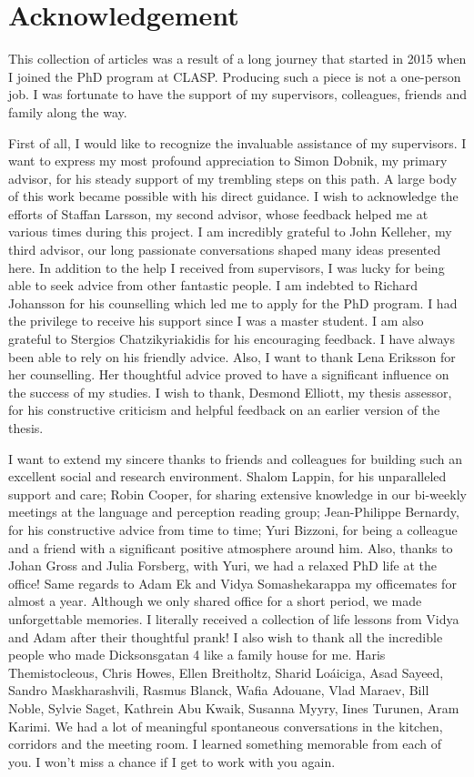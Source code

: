 \chapter*{Acknowledgement}
\label{sec:acknowledgement}
This collection of articles was a result of a long journey that started in 2015 when I joined the PhD program at CLASP. Producing such a piece is not a one-person job. I was fortunate to have the support of my supervisors, colleagues, friends and family along the way.

First of all, I would like to recognize the invaluable assistance of my supervisors. 
I want to express my most profound appreciation to Simon Dobnik, my primary advisor, for his steady support of my trembling steps on this path. A large body of this work became possible with his direct guidance. 
I wish to acknowledge the efforts of Staffan Larsson, my second advisor, whose feedback helped me at various times during this project. 
I am incredibly grateful to John Kelleher, my third advisor, our long passionate conversations shaped many ideas presented here.
In addition to the help I received from supervisors, I was lucky for being able to seek advice from other fantastic people. 
I am indebted to Richard Johansson for his counselling which led me to apply for the PhD program. I had the privilege to receive his support since I was a master student. 
I am also grateful to Stergios Chatzikyriakidis for his encouraging feedback. I have always been able to rely on his friendly advice.
Also, I want to thank Lena Eriksson for her counselling. Her thoughtful advice proved to have a significant influence on the success of my studies.
I wish to thank, Desmond Elliott, my thesis assessor, for his constructive criticism and helpful feedback on an earlier version of the thesis.

I want to extend my sincere thanks to friends and colleagues for building such an excellent social and research environment. 
Shalom Lappin, for his unparalleled support and care;
Robin Cooper, for sharing extensive knowledge in our bi-weekly meetings at the language and perception reading group; 
Jean-Philippe Bernardy, for his constructive advice from time to time;
Yuri Bizzoni, for being a colleague and a friend with a significant positive atmosphere around him. Also, thanks to Johan Gross and Julia Forsberg, with Yuri, we had a relaxed PhD life at the office! 
Same regards to Adam Ek and Vidya Somashekarappa my officemates for almost a year. Although we only shared office for a short period, we made unforgettable memories. I literally received a collection of life lessons from Vidya and Adam after their thoughtful prank! 
I also wish to thank all the incredible people who made Dicksonsgatan 4 like a family house for me. Haris Themistocleous, Chris Howes, Ellen Breitholtz, Sharid Loáiciga, Asad Sayeed, Sandro Maskharashvili, Rasmus Blanck, Wafia Adouane, Vlad Maraev, Bill Noble, Sylvie Saget, Kathrein Abu Kwaik, Susanna Myyry, Iines Turunen, Aram Karimi. We had a lot of meaningful spontaneous conversations in the kitchen, corridors and the meeting room. I learned something memorable from each of you. I won't miss a chance if I get to work with you again. 

